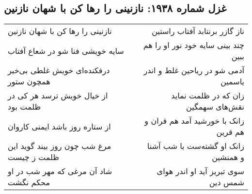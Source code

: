 \begin{center}
\section*{غزل شماره ۱۹۳۸: نازنینی را رها کن با شهان نازنین}
\label{sec:1938}
\begin{longtable}{l p{0.5cm} r}
نازنینی را رها کن با شهان نازنین
&&
ناز گازر برنتابد آفتاب راستین
\\
سایه خویشی فنا شو در شعاع آفتاب
&&
چند بینی سایه خود نور او را هم ببین
\\
درفکنده‌ای خویش غلطی بی‌خبر همچون ستور
&&
آدمی شو در ریاحین غلط و اندر یاسمین
\\
از خیال خویش ترسد هر کی در ظلمت بود
&&
زان که در ظلمت نماید نقش‌های سهمگین
\\
از ستاره روز باشد ایمنی کاروان
&&
زانک با خورشید آمد هم قران و هم قرین
\\
مرغ شب چون روز بیند گوید این ظلمت ز چیست
&&
زانک او گشته‌ست با شب آشنا و همنشین
\\
شاد آن مرغی که مهر شب در او محکم نگشت
&&
سوی تبریز آید او اندر هوای شمس دین
\\
\end{longtable}
\end{center}
